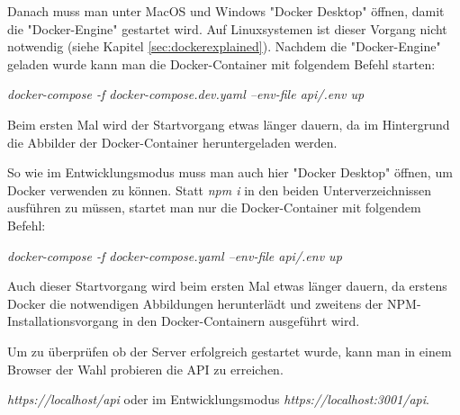 Danach muss man unter MacOS und Windows "Docker Desktop" öffnen, damit die "Docker-Engine" gestartet wird. Auf Linuxsystemen ist dieser Vorgang nicht notwendig (siehe Kapitel \ref{sec:dockerexplained}). Nachdem die "Docker-Engine" geladen wurde kann man die Docker-Container mit folgendem Befehl starten:

\emph{docker-compose -f docker-compose.dev.yaml --env-file api/.env up}  

Beim ersten Mal wird der Startvorgang etwas länger dauern, da im Hintergrund die Abbilder der Docker-Container heruntergeladen werden.


So wie im Entwicklungsmodus muss man auch hier "Docker Desktop" öffnen, um Docker verwenden zu können. Statt \emph{npm i} in den beiden Unterverzeichnissen ausführen zu müssen, startet man nur die Docker-Container mit folgendem Befehl:

\emph{docker-compose -f docker-compose.yaml --env-file api/.env up}

Auch dieser Startvorgang wird beim ersten Mal etwas länger dauern, da erstens Docker die notwendigen Abbildungen herunterlädt und zweitens der NPM-Installationsvorgang in den Docker-Containern ausgeführt wird.

Um zu überprüfen ob der Server erfolgreich gestartet wurde, kann man in einem Browser der Wahl probieren die API zu erreichen. 

\emph{https://localhost/api} oder im Entwicklungsmodus \emph{https://localhost:3001/api}.